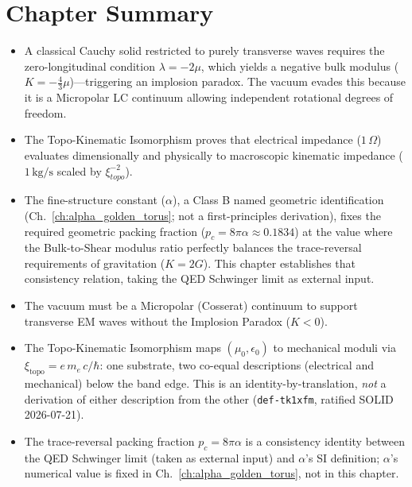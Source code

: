 \section*{Chapter Summary}
\begin{itemize}
    \item A classical Cauchy solid restricted to purely transverse waves requires the zero-longitudinal condition $\lambda = -2\mu$, which yields a negative bulk modulus ($K = -\frac{4}{3}\mu$)---triggering an implosion paradox. The vacuum evades this because it is a Micropolar LC continuum allowing independent rotational degrees of freedom.
    \item The Topo-Kinematic Isomorphism proves that electrical impedance ($1\,\Omega$) evaluates dimensionally and physically to macroscopic kinematic impedance ($1\,\text{kg/s}$ scaled by $\xi_{topo}^{-2}$).
    \item The fine-structure constant ($\alpha$), a Class B named geometric identification (Ch.~\ref{ch:alpha_golden_torus}; not a first-principles derivation), fixes the required geometric packing fraction ($p_c = 8\pi\alpha \approx 0.1834$) at the value where the Bulk-to-Shear modulus ratio perfectly balances the trace-reversal requirements of gravitation ($K = 2G$). This chapter establishes that consistency relation, taking the QED Schwinger limit as external input.
\end{itemize}

\begin{summarybox}
\begin{itemize}
    \item The vacuum must be a Micropolar (Cosserat) continuum to support transverse EM waves without the Implosion Paradox ($K < 0$).
    \item The Topo-Kinematic Isomorphism maps $(\mu_0, \epsilon_0)$ to mechanical moduli via $\xi_{\text{topo}} = e\,m_e\,c/\hbar$: one substrate, two co-equal descriptions (electrical and mechanical) below the band edge. This is an identity-by-translation, \emph{not} a derivation of either description from the other (\texttt{def-tk1xfm}, ratified SOLID 2026-07-21).
    \item The trace-reversal packing fraction $p_c = 8\pi\alpha$ is a consistency identity between the QED Schwinger limit (taken as external input) and $\alpha$'s SI definition; $\alpha$'s numerical value is fixed in Ch.~\ref{ch:alpha_golden_torus}, not in this chapter.
\end{itemize}
\end{summarybox}

